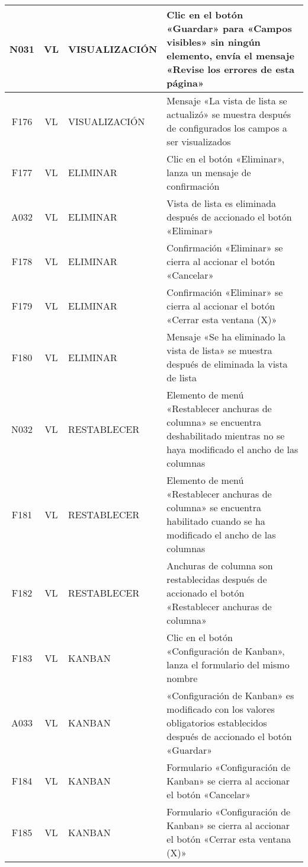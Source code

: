 \begin{landscape}
{\begin{longtable}[htb]{|c|c|p{3.8cm}|p{15.2cm}|}
\scriptsize{N031} & \scriptsize{VL} & \scriptsize{VISUALIZACIÓN} & \scriptsize{Clic en el botón «Guardar» para «Campos visibles» sin ningún elemento, envía el mensaje «Revise los errores de esta página»} \\ \hline
\scriptsize{F176} & \scriptsize{VL} & \scriptsize{VISUALIZACIÓN} & \scriptsize{Mensaje «La vista de lista se actualizó» se muestra después de configurados los campos a ser visualizados} \\ \hline
\scriptsize{F177} & \scriptsize{VL} & \scriptsize{ELIMINAR} & \scriptsize{Clic en el botón «Eliminar», lanza un mensaje de confirmación} \\ \hline
\scriptsize{A032} & \scriptsize{VL} & \scriptsize{ELIMINAR} & \scriptsize{Vista de lista es eliminada después de accionado el botón «Eliminar»} \\ \hline
\scriptsize{F178} & \scriptsize{VL} & \scriptsize{ELIMINAR} & \scriptsize{Confirmación «Eliminar» se cierra al accionar el botón «Cancelar»} \\ \hline
\scriptsize{F179} & \scriptsize{VL} & \scriptsize{ELIMINAR} & \scriptsize{Confirmación «Eliminar» se cierra al accionar el botón «Cerrar esta ventana (X)»} \\ \hline
\scriptsize{F180} & \scriptsize{VL} & \scriptsize{ELIMINAR} & \scriptsize{Mensaje «Se ha eliminado la vista de lista» se muestra después de eliminada la vista de lista} \\ \hline
\scriptsize{N032} & \scriptsize{VL} & \scriptsize{RESTABLECER} & \scriptsize{Elemento de menú «Restablecer anchuras de columna» se encuentra deshabilitado mientras no se haya modificado el ancho de las columnas} \\ \hline
\scriptsize{F181} & \scriptsize{VL} & \scriptsize{RESTABLECER} & \scriptsize{Elemento de menú «Restablecer anchuras de columna» se encuentra habilitado cuando se ha modificado el ancho de las columnas} \\ \hline
\scriptsize{F182} & \scriptsize{VL} & \scriptsize{RESTABLECER} & \scriptsize{Anchuras de columna son restablecidas después de accionado el botón «Restablecer anchuras de columna»} \\ \hline
\scriptsize{F183} & \scriptsize{VL} & \scriptsize{KANBAN} & \scriptsize{Clic en el botón «Configuración de Kanban», lanza el formulario del mismo nombre} \\ \hline
\scriptsize{A033} & \scriptsize{VL} & \scriptsize{KANBAN} & \scriptsize{«Configuración de Kanban» es modificado con los valores obligatorios establecidos después de accionado el botón «Guardar»} \\ \hline
\scriptsize{F184} & \scriptsize{VL} & \scriptsize{KANBAN} & \scriptsize{Formulario «Configuración de Kanban» se cierra al accionar el botón «Cancelar»} \\ \hline
\scriptsize{F185} & \scriptsize{VL} & \scriptsize{KANBAN} & \scriptsize{Formulario «Configuración de Kanban» se cierra al accionar el botón «Cerrar esta ventana (X)»} \\ \hline
\end{longtable}
}
\end{landscape}

